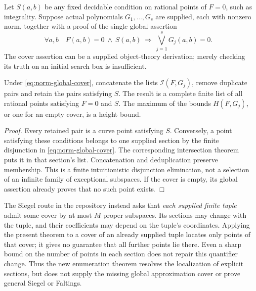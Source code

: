 Let \(S(a,b)\) be any fixed decidable condition on rational points
of \(F=0\), such as integrality.  Suppose actual polynomials
\(G_1,\ldots,G_s\) are supplied, each with nonzero norm, together
with a proof of the single global assertion
\[
 \forall a,b\quad
 F(a,b)=0\ \wedge\ S(a,b)
 \ \Longrightarrow\ \bigvee_{j=1}^{s}G_j(a,b)=0.
 \tag{GC}\label{eq:norm-global-cover}
\]
The cover assertion can be a supplied object-theory derivation;
merely checking its truth on an initial search box is insufficient.

\begin{corollary}
\label{cor:norm-global-list}
Under \eqref{eq:norm-global-cover}, concatenate the lists
\(\mathcal I(F,G_j)\), remove duplicate pairs and retain the
pairs satisfying \(S\).  The result is a complete finite list of
all rational points satisfying \(F=0\) and \(S\).
The maximum of the bounds \(H(F,G_j)\), or one for an empty
cover, is a height bound.
\end{corollary}

\begin{proof}
Every retained pair is a curve point satisfying \(S\).  Conversely,
a point satisfying these conditions belongs to one supplied section
by the finite disjunction in \eqref{eq:norm-global-cover}.  The
corresponding intersection theorem puts it in that section's list.
Concatenation and deduplication preserve membership.  This is a
finite intuitionistic disjunction elimination, not a selection of
an infinite family of exceptional subspaces.  If the cover is
empty, its global assertion already proves that no such point exists.
\end{proof}

The Siegel route in the repository instead asks that \emph{each
supplied finite tuple} admit some cover by at most \(M\) proper
subspaces.  Its sections may change with the tuple, and their
coefficients may depend on the tuple's coordinates.  Applying the
present theorem to a cover of an already supplied tuple locates
only points of that cover; it gives no guarantee that all further
points lie there.  Even a sharp bound on the number of points in
each section does not repair this quantifier change.  Thus the
new enumeration theorem resolves the localization of explicit
sections, but does not supply the missing global approximation
cover or prove general Siegel or Faltings.

